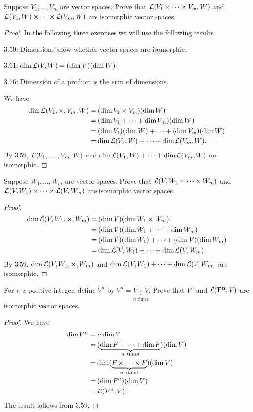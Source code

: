 \begin{exercise}{4}
  Suppose $V_1,\dots,V_m$ are vector spaces. Prove that $\mathcal{L}(V_1\times\dots\times V_m, W)$ and $\mathcal{L}(V_1,W)\times\dots\times \mathcal{L}(V_m, W)$ are isomorphic vector spaces.
\end{exercise}
\begin{proof}
 In the following three exercises we will use the following results:

 3.59: Dimensions show whether vector spaces are isomorphic.

 3.61: $\dim\mathcal{L}(V,W)=(\dim V)(\dim W)$

 3.76: Dimension of a product is the sum of dimensions.

 We have 
 \begin{align*}
 \dim\mathcal{L}(V_1,\times,V_m, W) &=
 (\dim V_1\times V_m)(\dim W)\\
 &=(\dim V_1+\dots +\dim V_m)(\dim W)\\
 &=(\dim V_1)(\dim W)+\dots+(\dim V_m)(\dim W)\\
 &=\dim\mathcal{L}(V_1,W)+\dots+\dim\mathcal{L}(V_m,W).
 \end{align*}
      By 3.59, $\mathcal{L}(V_1,\dots,V_m,W)$ and $\dim\mathcal{L}(V_1,W)+\dots+\dim\mathcal{L}(V_m,W)$ are isomorphic.
\end{proof}

\begin{exercise}{5}
  Suppose $W_1,\dots,W_m$ are vector spaces. Prove that $\mathcal{L}(V,W_1\times\dots\times W_m)$ and $\mathcal{L}(V,W_1)\times\dots\times\mathcal{L}(V,W_m)$ are isomorphic vector spaces.
\end{exercise}
\begin{proof}
 \begin{align*}
 \dim\mathcal{L}(V,W_1,\times,W_m) &=
 (\dim V)(\dim W_1\times W_m)\\
 &=(\dim V)(\dim W_1+\dots +\dim W_m)\\
 &=(\dim V)(\dim W_1)+\dots+(\dim V)(\dim W_m)\\
 &=\dim\mathcal{L}(V,W_1)+\dots+\dim\mathcal{L}(V,W_m).
 \end{align*}
 By 3.59, $\dim\mathcal{L}(V,W_1,\times,W_m)$ and $\dim\mathcal{L}(V,W_1)+\dots+\dim\mathcal{L}(V,W_m)$ are isomorphic.
\end{proof}

\begin{exercise}{6}
  For $n$ a positive integer, define $V^n$ by $V^n=\underbrace{V\times V}_{n\text{ times}}$. Prove that $V^n$ and $\mathcal{L}(\mathbf{F^n}, V)$ are isomorphic vector spaces.
\end{exercise}
\begin{proof}
 We have
 \begin{align*}
     \dim V^n &= n\dim V\\
     &= (\underbrace{\dim F+\dots+\dim F}_{n\text{ times}})(\dim V)\\
     &= \dim(\underbrace{F\times\dots\times F}_{n\text{ times}})(\dim V)\\
     &= (\dim F^n)(\dim V)\\
     &= \mathcal{L}(F^n, V).
 \end{align*}
The result follows from 3.59.
\end{proof}


